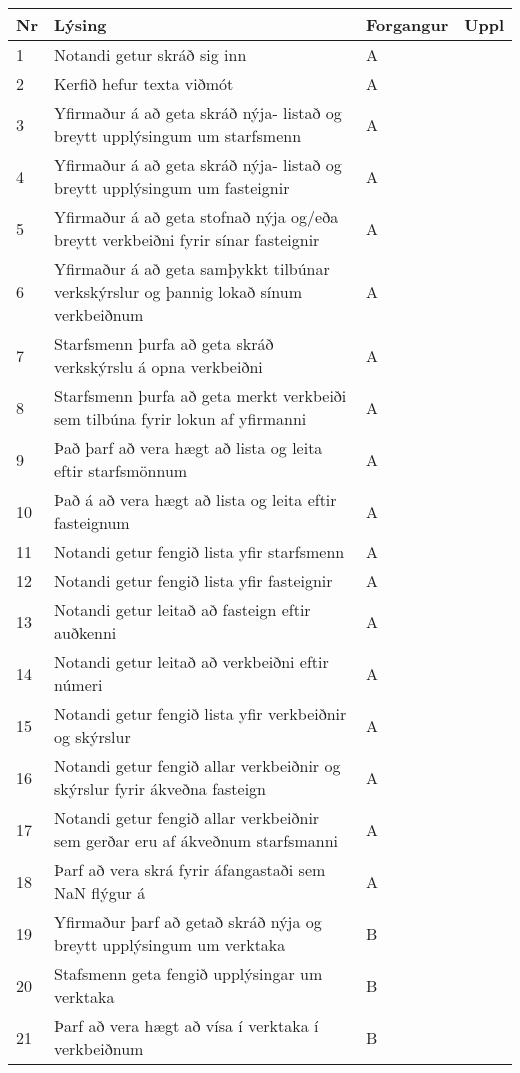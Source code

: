 \documentclass[a4paper]{article}
\begin{document}
\begin{tabular}{|l|p{10cm}|l|l|}
\hline
Nr& Lýsing& Forgangur& Uppl\\
\hline
1& Notandi getur skráð sig inn & A &\\
\hline
2& Kerfið hefur texta viðmót & A &\\
\hline
3& Yfirmaður á að geta skráð nýja-  listað og breytt upplýsingum um starfsmenn & A &\\
\hline
4& Yfirmaður á að geta skráð nýja- listað og breytt upplýsingum um fasteignir & A &\\
\hline
5& Yfirmaður á að geta stofnað nýja og/eða breytt verkbeiðni fyrir sínar fasteignir & A &\\
\hline
6& Yfirmaður á að geta samþykkt tilbúnar verkskýrslur og þannig lokað sínum verkbeiðnum & A &\\
\hline
7& Starfsmenn þurfa að geta skráð verkskýrslu á opna verkbeiðni & A &\\
\hline
8& Starfsmenn þurfa að geta merkt verkbeiði sem tilbúna fyrir lokun af yfirmanni & A &\\
\hline
9& Það þarf að vera hægt að lista og leita eftir starfsmönnum & A &\\
\hline
10& Það á að vera hægt að lista og leita eftir fasteignum & A &\\
\hline
11& Notandi getur fengið lista yfir starfsmenn & A &\\
\hline
12& Notandi getur fengið lista yfir fasteignir & A &\\
\hline
13& Notandi getur leitað að fasteign eftir auðkenni & A &\\
\hline
14& Notandi getur leitað að verkbeiðni eftir númeri & A &\\
\hline
15& Notandi getur fengið lista yfir verkbeiðnir og skýrslur & A &\\
\hline
16& Notandi getur fengið allar verkbeiðnir og skýrslur fyrir ákveðna fasteign & A &\\
\hline
17& Notandi getur fengið allar verkbeiðnir sem gerðar eru af ákveðnum starfsmanni & A &\\
\hline
18& Þarf að vera skrá fyrir áfangastaði sem NaN flýgur á & A &\\
\hline
19& Yfirmaður þarf að getað skráð nýja og breytt upplýsingum um verktaka & B &\\
\hline
20& Stafsmenn geta fengið upplýsingar um verktaka & B &\\
\hline
21& Þarf að vera hægt að vísa í verktaka í verkbeiðnum & B &\\

\end{tabular}
\end{document}

